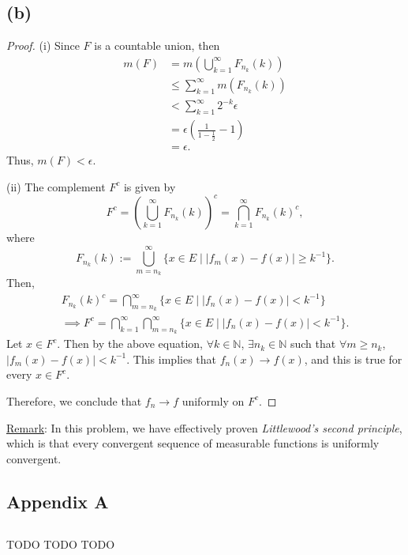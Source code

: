 \documentclass{article}
\newcommand{\N}{\mathbb{N}} %
\begin{document}
\subsection*{(b)}
\begin{proof}
	(i) Since $F$ is a countable union, then
	\begin{align}
		m(F) &= m\left(\bigcup_{k=1}^{\infty} F_{n_k}(k)\right) \\
		& \leq \sum_{k=1}^{\infty} m\left(F_{n_k}(k)\right) \\
		&< \sum_{k=1}^{\infty}2^{-k}\epsilon \\
		&= \epsilon\left(\frac{1}{1-\frac{1}{2}} - 1\right) \\
		&= \epsilon.
	\end{align}
	Thus, $m(F) < \epsilon$.
	
	(ii) The complement $F^c$ is given by
	\begin{equation}
		F^c = \left(\bigcup_{k=1}^{\infty} F_{n_k}(k)\right)^c = \bigcap_{k=1}^{\infty} F_{n_k}(k)^c,
	\end{equation}
	where
	\begin{equation}
		F_{n_k}(k) := \bigcup_{m=n_k}^{\infty} \{x \in E \;|\; |f_m(x) - f(x)|\geq k^{-1}\}.
	\end{equation}
	Then,
	\begin{align}
		F_{n_k}(k)^c = \bigcap_{m=n_k}^{\infty}\{x \in E \;|\; |f_n(x) - f(x)| < k^{-1}\} \\
		\implies F^c = \bigcap_{k=1}^{\infty}\bigcap_{m=n_k}^{\infty}\{x \in E \;|\; |f_n(x) - f(x)| < k^{-1}\}.
	\end{align}
	Let $x \in F^c$. Then by the above equation, $\forall k \in \N$, $\exists n_k \in \N$ such that $\forall m \geq n_k$, $|f_m(x) - f(x)| < k^{-1}$. This implies that $f_n(x) \rightarrow f(x)$, and this is true for every $x \in F^c$.
	
	Therefore, we conclude that $f_n \rightarrow f$ uniformly on $F^c$.
\end{proof}
\underline{Remark}: In this problem, we have effectively proven \textit{Littlewood's second principle}, which is that every convergent sequence of measurable functions is uniformly convergent.
\begin{appendices}
	
\section{Appendix A}
\subsection{}
\label{appendix:A.1}
TODO TODO TODO

\end{appendices}
\end{document}
